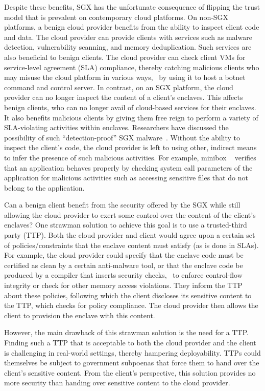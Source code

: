 Despite these benefits, SGX has the unfortunate consequence of flipping the
trust model that is prevalent on contemporary cloud platforms. On non-SGX
platforms, a benign cloud provider benefits from the ability to inspect client
code and data. The cloud provider can provide clients with services such as
malware detection, vulnerability scanning, and memory deduplication. Such
services are also beneficial to benign clients.  The cloud provider can check
client VMs for service-level agreement (SLA) compliance, thereby catching
malicious clients who may misuse the cloud platform in various ways, \eg~by
using it to host a botnet command and control server. In contrast, on an SGX
platform, the cloud provider can no longer inspect the content of a client's
enclaves. This affects benign clients, who can no longer avail of cloud-based
services for their enclaves. It also benefits malicious clients by giving them
free reign to perform a variety of SLA-violating activities within enclaves.
Researchers have discussed the possibility of such ``detection-proof'' SGX
malware~\cite{davenportford:vbtn,rutkowska:aug13,rutkowska:sep13}.  Without the
ability to inspect the client's code, the cloud provider is left to using
other, indirect means to infer the presence of such malicious activities. For
example, minibox ~\cite{minibox:atc14} verifies that an application behaves properly
by checking system call parameters of the application for malicious activities such as
accessing sensitive files that do not belong to the application.

Can a benign client benefit from the security offered by the SGX while still
allowing the cloud provider to exert some control over the content of the
client's enclaves? One strawman solution to achieve this goal is to use a
trusted-third party (TTP). Both the cloud provider and client would agree upon
a certain set of policies/constraints that the enclave content must satisfy (as
is done in SLAs). For example, the cloud provider could specify that the
enclave code must be certified as clean by a certain anti-malware tool, or that
the enclave code be produced by a compiler that inserts security checks, \eg~to
enforce control-flow integrity or check for other memory access violations.
They inform the TTP about these policies, following which the client discloses
its sensitive content to the TTP, which checks for policy compliance.  The
cloud provider then allows the client to provision the enclave with this
content.

However, the main drawback of this strawman solution is the need for a TTP.
Finding such a TTP that is acceptable to both the cloud provider and the client
is challenging in real-world settings, thereby hampering deployability. TTPs
could themselves be subject to government subpoenas that force them to hand
over the client's sensitive content. From the client's perspective, this
solution provides no more security than handing over sensitive
content to the cloud provider.  

